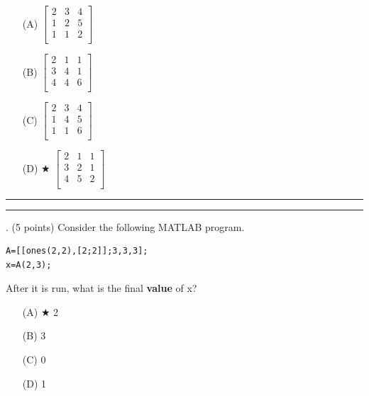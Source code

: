 \documentclass{article}
\begin{document}
\begin{enumerate}
\item[(A)]
$ \left[ \begin{array}{ccc} 2 & 3 & 4 \\ 1 & 2 & 5 \\ 1 & 1 & 2  \\ \end{array} \right] $

\item[(B)]
$ \left[ \begin{array}{ccc} 2 & 1 & 1 \\ 3 & 4 & 1 \\ 4 & 4 & 6 \\ \end{array} \right] $

\item[(C)]
$ \left[ \begin{array}{ccc} 2 & 3 & 4 \\ 1 & 4 & 5 \\ 1 & 1 & 6  \\ \end{array} \right] $

\item[(D)] $\bigstar$ 
$ \left[ \begin{array}{ccc} 2 & 1 & 1 \\ 3 & 2 & 1 \\ 4 & 5 & 2 \\ \end{array} \right] $

\end{enumerate}

\vspace*{2em}
\hrule
\vspace{2em}

\vspace{2em}
\hrule height 2pt


\newpage
{}. (5 points)
Consider the following MATLAB program.
\begin{verbatim}
A=[[ones(2,2),[2;2]];3,3,3];
x=A(2,3);
\end{verbatim}
After it is run, what is the final \textbf{value} of x?


\begin{enumerate}
\item[(A)] $\bigstar$ 
2

\item[(B)]
3

\item[(C)]
0

\item[(D)]
1

\end{enumerate}
\end{document}
